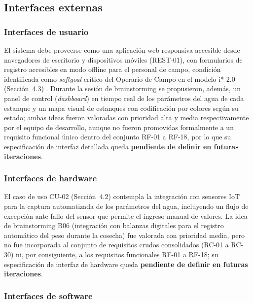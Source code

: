 \documentclass[12pt,a4paper]{article}
\begin{document}
\subsection{Interfaces externas}

\subsubsection{Interfaces de usuario}

El sistema debe proveerse como una aplicación web responsiva accesible desde
navegadores de escritorio y dispositivos móviles (REST-01), con formularios de
registro accesibles en modo offline para el personal de campo, condición
identificada como \textit{softgoal} crítico del Operario de Campo en el modelo
i* 2.0 (Sección~4.3) \cite{Yu1995}. Durante la sesión de brainstorming se
propusieron, además, un panel de control (\textit{dashboard}) en tiempo real de
los parámetros del agua de cada estanque y un mapa visual de estanques con
codificación por colores según su estado; ambas ideas fueron valoradas con
prioridad alta y media respectivamente por el equipo de desarrollo, aunque no
fueron promovidas formalmente a un requisito funcional único dentro del
conjunto RF-01 a RF-18, por lo que su especificación de interfaz detallada
queda \textbf{pendiente de definir en futuras iteraciones}.

\subsubsection{Interfaces de hardware}

El caso de uso CU-02 (Sección~4.2) contempla la integración con sensores IoT
para la captura automatizada de los parámetros del agua, incluyendo un flujo de
excepción ante fallo del sensor que permite el ingreso manual de valores. La
idea de brainstorming B06 (integración con balanzas digitales para el registro
automático del peso durante la cosecha) fue valorada con prioridad media, pero
no fue incorporada al conjunto de requisitos crudos consolidados (RC-01 a
RC-30) ni, por consiguiente, a los requisitos funcionales RF-01 a RF-18; su
especificación de interfaz de hardware queda \textbf{pendiente de definir en
futuras iteraciones}.

\subsubsection{Interfaces de software}
\end{document}
